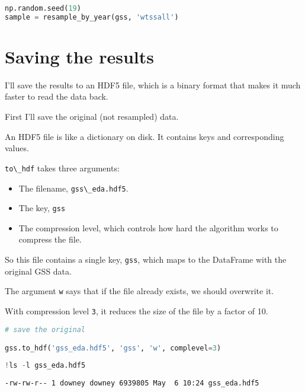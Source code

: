 \begin{lstlisting}[language=Python,style=source]
np.random.seed(19)
sample = resample_by_year(gss, 'wtssall')
\end{lstlisting}

\hypertarget{saving-the-results}{%
\section{Saving the results}\label{saving-the-results}}

I'll save the results to an HDF5 file, which is a binary format that
makes it much faster to read the data back.

First I'll save the original (not resampled) data.

An HDF5 file is like a dictionary on disk. It contains keys and
corresponding values.

\passthrough{\lstinline!to\_hdf!} takes three arguments:

\begin{itemize}
\item
  The filename, \passthrough{\lstinline!gss\_eda.hdf5!}.
\item
  The key, \passthrough{\lstinline!gss!}
\item
  The compression level, which controls how hard the algorithm works to
  compress the file.
\end{itemize}

So this file contains a single key, \passthrough{\lstinline!gss!}, which
maps to the DataFrame with the original GSS data.

The argument \passthrough{\lstinline!w!} says that if the file already
exists, we should overwrite it.

With compression level \passthrough{\lstinline!3!}, it reduces the size
of the file by a factor of 10.

\begin{lstlisting}[language=Python,style=source]
# save the original

gss.to_hdf('gss_eda.hdf5', 'gss', 'w', complevel=3)
\end{lstlisting}

\begin{lstlisting}[language=Python,style=source]
!ls -l gss_eda.hdf5
\end{lstlisting}

\begin{lstlisting}[style=output]
-rw-rw-r-- 1 downey downey 6939805 May  6 10:24 gss_eda.hdf5
\end{lstlisting}

